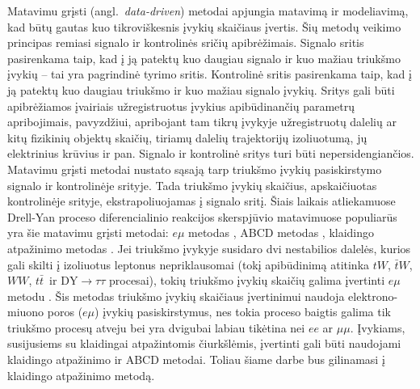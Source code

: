 \documentclass[a4paper, 12pt, oneside]{article}
\newcommand{\tbarW}{\bar{t}W}
\newcommand{\ttbar}{t\bar{t}}
\newcommand{\emu}{e\mu}
\newcommand{\DYtau}{\mathrm{DY} \! \rightarrow \! \tau\tau}
\begin{document}
Matavimu grįsti (angl.\ \textit{data-driven}) metodai apjungia matavimą ir modeliavimą, kad būtų gautas kuo
tikroviškesnis įvykių skaičiaus įvertis.
Šių metodų veikimo principas remiasi signalo ir kontrolinės sričių apibrėžimais.
Signalo sritis pasirenkama taip, kad į ją patektų kuo daugiau signalo ir kuo mažiau triukšmo įvykių -- tai yra pagrindinė
tyrimo sritis.
Kontrolinė sritis pasirenkama taip, kad į ją patektų kuo daugiau triukšmo ir kuo mažiau signalo įvykių.
Sritys gali būti apibrėžiamos įvairiais užregistruotus įvykius apibūdinančių parametrų apribojimais, pavyzdžiui,
apribojant tam tikrų įvykyje užregistruotų dalelių ar kitų fizikinių objektų skaičių, tiriamų dalelių trajektorijų izoliuotumą, jų
elektrinius krūvius ir pan.
Signalo ir kontrolinė sritys turi būti nepersidengiančios.
Matavimu grįsti metodai nustato sąsają tarp triukšmo įvykių pasiskirstymo signalo ir kontrolinėje srityje.
Tada triukšmo įvykių skaičius, apskaičiuotas kontrolinėje srityje, ekstrapoliuojamas į signalo sritį.
Šiais laikais atliekamuose Drell-Yan proceso diferencialinio reakcijos skerspjūvio matavimuose populiarūs yra šie matavimu
grįsti metodai: $\emu$ metodas \cite{DY_CMS2011, DY_CMS2013, DY_ATLAS2014, DY_CMS2015, DY_CMS2019},
ABCD metodas \cite{DY_CMS2011, DY_CMS2013, DY_ATLAS2014, DY_CMS2015, DY_ATLAS2016, DY_ATLAS2017},
klaidingo atpažinimo metodas \cite{DY_CMS2011, DY_CMS2013, DY_ATLAS2013, DY_CMS2015, DY_ATLAS2016, DY_CMS2019}.
Jei triukšmo įvykyje susidaro dvi nestabilios dalelės, kurios gali skilti į izoliuotus leptonus nepriklausomai
(tokį apibūdinimą atitinka $tW$, $\tbarW$, $WW$, $\ttbar\,$ ir $\DYtau$ procesai), tokių triukšmo įvykių skaičių galima įvertinti
$\emu$ metodu \cite{MAbak}.
Šis metodas triukšmo įvykių skaičiaus įvertinimui naudoja elektrono-miuono poros ($\emu$) įvykių pasiskirstymus, nes tokia proceso
baigtis galima tik triukšmo procesų atveju bei yra dvigubai labiau tikėtina nei $ee$ ar $\mu\mu$.
Įvykiams, susijusiems su klaidingai atpažintomis čiurkšlėmis, įvertinti gali būti naudojami klaidingo atpažinimo ir ABCD metodai.
Toliau šiame darbe bus gilinamasi į klaidingo atpažinimo metodą.
\end{document}
